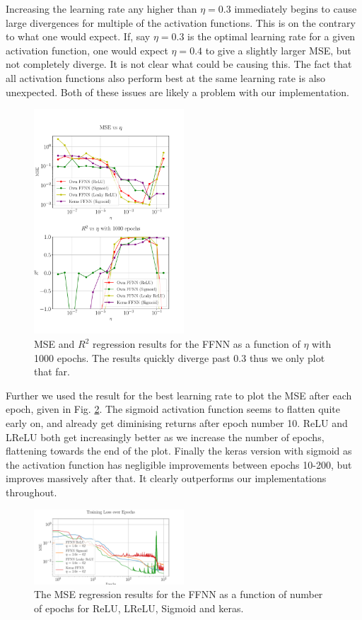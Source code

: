\documentclass[%
reprint,
amsmath,amssymb,
aps,
]{revtex4-2}
\begin{document}
Increasing the learning rate any higher than $\eta=0.3$ immediately begins to cause large divergences for multiple of the activation functions. This is on the contrary to what one would expect. If, say $\eta=0.3$ is the optimal learning rate for a given activation function, one would expect $\eta=0.4$ to give a slightly larger MSE, but not completely diverge. It is not clear what could be causing this. The fact that all activation functions also perform best at the same learning rate is also unexpected. Both of these issues are likely a problem with our implementation.
\begin{figure}[ht!]
	\includegraphics[width=0.5\textwidth]{Python/Figures/NN_MSE_R2_Franke_LearningRate_Epochs1000.pdf}
	\caption{MSE and $R^2$ regression results for the FFNN as a function of $\eta$ with 1000 epochs. The results quickly diverge past $0.3$ thus we only plot that far.}
	\label{fig:NN_Franke_LR_1000}
\end{figure}

Further we used the result for the best learning rate to plot the MSE after each epoch, given in Fig. \ref{fig:NN_Franke_Epochs}. The sigmoid activation function seems to flatten quite early on, and already get diminising returns after epoch number 10. ReLU and LReLU both get increasingly better as we increase the number of epochs, flattening towards the end of the plot. Finally the keras version with sigmoid as the activation function has negligible improvements between epochs 10-200, but improves massively after that. It clearly outperforms our implementations throughout. 
\begin{figure}[ht!]
	\includegraphics[width=0.5\textwidth]{Python/Figures/NN_MSE_Franke_Epoch.pdf}
	\caption{The MSE regression results for the FFNN as a function of number of epochs for ReLU, LReLU, Sigmoid and keras.}
	\label{fig:NN_Franke_Epochs}
\end{figure}
\end{document}
